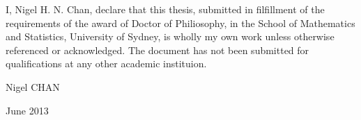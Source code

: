 
\begin{declaration} %
I, Nigel H. N. Chan, declare that this thesis, submitted in filfillment of the requirements of the award of Doctor of Philiosophy, in the School of Mathematics and Statistics, University of Sydney, is wholly my own work unless otherwise referenced or acknowledged. The document has not been submitted for qualifications at any other academic instituion. 

\vskip 2cm
\hfill Nigel CHAN

\hfill June 2013
\end{declaration}


